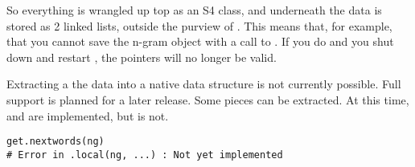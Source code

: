 So everything is wrangled up top as an S4 class, and underneath the data is 
stored as 2 linked lists, outside the purview of \R.  This means that, for 
example, that you cannot save the n-gram object with a call to .  
If you do and you shut down and restart \R, the pointers will no longer be
valid.

Extracting a the data into a native \R data structure is not currently 
possible.  Full support is planned for a later release.  Some pieces can be extracted.  At this time,  and  are implemented, but  is not.

\begin{lstlisting}[language=rr]
get.nextwords(ng)
# Error in .local(ng, ...) : Not yet implemented
\end{lstlisting}
